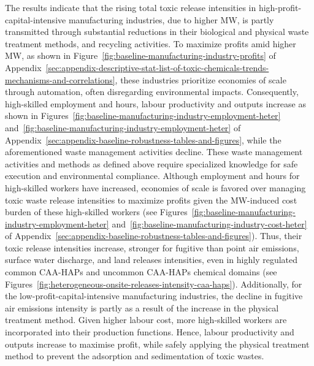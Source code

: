 \documentclass[12pt, english]{article}
\begin{document}
    The results indicate that the rising total toxic release intensities in high-profit-capital-intensive manufacturing industries, due to higher MW, is partly transmitted through substantial reductions in their biological and physical waste treatment methods, and recycling activities. To maximize profits amid higher MW, as shown in Figure~\ref{fig:baseline-manufacturing-industry-profits} of Appendix~\ref{sec:appendix-descriptive-stat-list-of-toxic-chemicals-trends-mechanisms-and-correlations}, these industries prioritize economies of scale through automation, often disregarding environmental impacts. Consequently, high-skilled employment and hours, labour productivity and outputs increase as shown in Figures~\ref{fig:baseline-manufacturing-industry-employment-heter} and~\ref{fig:baseline-manufacturing-industry-employment-heter} of Appendix~\ref{sec:appendix-baseline-robustness-tables-and-figures}, while the aforementioned waste management activities decline. These waste management activities and methods as defined above require specialized knowledge for safe execution and environmental compliance. Although employment and hours for high-skilled workers have increased, economies of scale is favored over managing toxic waste release intensities to maximize profits given the MW-induced cost burden of these high-skilled workers (see Figures~\ref{fig:baseline-manufacturing-industry-employment-heter} and~\ref{fig:baseline-manufacturing-industry-cost-heter} of Appendix~\ref{sec:appendix-baseline-robustness-tables-and-figures}). Thus, their toxic release intensities increase, stronger for fugitive than point air emissions, surface water discharge, and land releases intensities, even in highly regulated common CAA-HAPs and uncommon CAA-HAPs chemical domains  (see Figures~\ref{fig:heterogeneous-onsite-releases-intensity-caa-haps}). Additionally, for the low-profit-capital-intensive manufacturing industries, the decline in fugitive air emissions intensity is partly as a result of the increase in the physical treatment method. Given higher labour cost, more high-skilled workers are incorporated into their production functions. Hence, labour productivity and outputs increase to maximise profit, while safely applying the physical treatment method to prevent the adsorption and sedimentation of toxic wastes.
\end{document}
